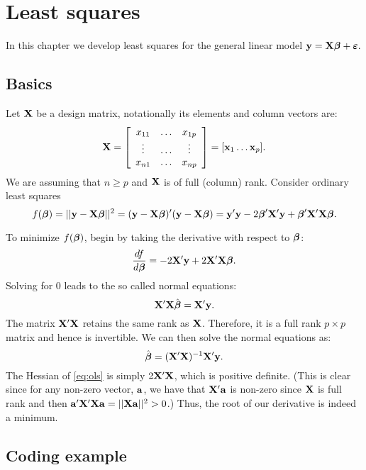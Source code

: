 \section{Least squares}

In this chapter we develop least squares for the general linear model $\mathbf{y=X\mbox{\boldmath $\beta$} + \mbox{\boldmath $\varepsilon$}}.$

\subsection{Basics}

Let $\mathbf{X}$ be a design matrix, notationally its
elements and column vectors are:
$$
\mathbf{X} =
\left[
\begin{array}{ccc}
x_{11} & \ldots & x_{1p}  \\
\vdots & \ldots & \vdots \\
x_{n1} & \ldots & x_{np}
\end{array}
\right]
= [\mathbf{x}_1 \ldots \mathbf{x}_p].
$$
We are assuming that $n \geq p$ and $\mathbf{X}$ is of full (column) rank. 
Consider ordinary least squares
\begin{equation}
\label{eq:ols}
f(\boldsymbol{\beta}) = || \mathbf{y} - \mathbf{X} \boldsymbol{\beta} ||^2 = (\mathbf{y} - \mathbf{X} \boldsymbol{\beta})' (\mathbf{y} - \mathbf{X} \boldsymbol{\beta})
= \mathbf{y}' \mathbf{y} - 2  \boldsymbol{\beta}' \mathbf{X}' \mathbf{y}  + \boldsymbol{\beta}' \mathbf{X}' \mathbf{X} \boldsymbol{\beta}.
\end{equation}

To minimize $f(\boldsymbol{\beta})$, begin by
taking the derivative with respect to $\boldsymbol{\beta}$:
$$
\frac{df}{d\boldsymbol{\beta}}
= -2 \mathbf{X}' \mathbf{y} + 2 \mathbf{X}' \mathbf{X} \boldsymbol{\beta}.
$$
Solving for $0$ leads to the so called normal equations:
$$\mathbf{X}' \mathbf{X} \hat {\boldsymbol{\beta}} = \mathbf{X}' \mathbf{y}.$$
The matrix $\mathbf{X}' \mathbf{X}$ retains the same rank as $\mathbf{X}$. Therefore,
it is a full rank $p\times p$ matrix and hence is invertible. We
can then solve the normal equations as:
\begin{equation}
\label{eq:betahat}
\hat {\boldsymbol{\beta}} = (\mathbf{X}' \mathbf{X})^{-1} \mathbf{X}' \mathbf{y}. \nonumber
\end{equation}
The Hessian of \eqref{eq:ols} is simply $2\mathbf{X}' \mathbf{X}$, which is positive
definite. (This is clear since for any non-zero vector, $\mathbf{a}$, we have that
$\mathbf{X}' \mathbf{a}$ is non-zero since $\mathbf{X}$ is full rank and then
$\mathbf{a}' \mathbf{X}' \mathbf{X} \mathbf{a} = ||\mathbf{X} \mathbf{a}||^2 > 0$.) Thus, the root of
our derivative is indeed a minimum. 

\subsection{Coding example}

